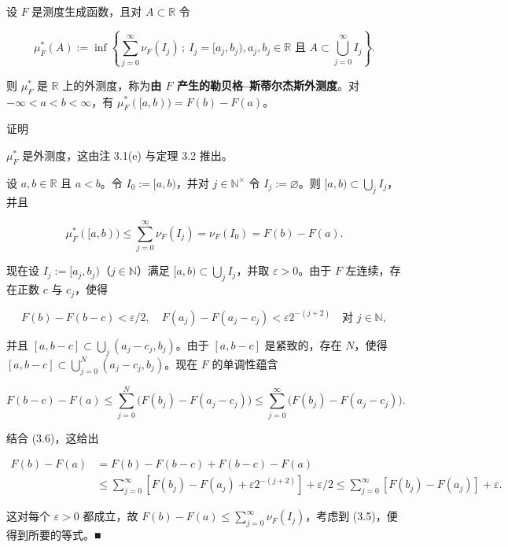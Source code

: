 \begin{proposition}

设 $ F $ 是测度生成函数，且对 $ A \subset \mathbb{R} $ 令

\[
\mu_F^*(A) := \inf\left\{ \sum_{j=0}^{\infty} \nu_F(I_j) \,;\ I_j = [a_j, b_j), a_j, b_j \in \mathbb{R} \text{ 且 } A \subset \bigcup_{j=0}^{\infty} I_j \right\} .
\]

则 $ \mu_F^* $ 是 $ \mathbb{R} $ 上的外测度，称为\textbf{由 $ F $ 产生的勒贝格–斯蒂尔杰斯外测度}。对 $ -\infty < a < b < \infty $，有 $ \mu_F^*([a,b)) = F(b) - F(a) $。

证明

\begin{subitems}
\item

$ \mu_F^* $ 是外测度，这由注 3.1(e) 与定理 3.2 推出。

\item

设 $ a, b \in \mathbb{R} $ 且 $ a < b $。令 $ I_0 := [a, b) $，并对 $ j \in \mathbb{N}^{\times} $ 令 $ I_j := \varnothing $。则 $ [a, b) \subset \bigcup_j I_j $，并且

\begin{equation}
\mu_F^*([a,b)) \le \sum_{j=0}^{\infty} \nu_F(I_j) = \nu_F(I_0) = F(b) - F(a) .\tag{3.5}
\end{equation}
\item

现在设 $ I_j := [a_j, b_j) $（$ j \in \mathbb{N} $）满足 $ [a, b) \subset \bigcup_j I_j $，并取 $ \varepsilon > 0 $。由于 $ F $ 左连续，存在正数 $ c $ 与 $ c_j $，使得

\begin{equation}
F(b) - F(b-c) < \varepsilon/2 , \quad F(a_j) - F(a_j - c_j) < \varepsilon 2^{-(j+2)} \quad \text{对 } j \in \mathbb{N} ,\tag{3.6}
\end{equation}

并且 $ [a, b-c] \subset \bigcup_j (a_j - c_j, b_j) $。由于 $ [a, b-c] $ 是紧致的，存在 $ N $，使得 $ [a, b-c] \subset \bigcup_{j=0}^{N} (a_j - c_j, b_j) $。现在 $ F $ 的单调性蕴含

\[
F(b-c) - F(a) \le \sum_{j=0}^{N} \big( F(b_j) - F(a_j - c_j) \big) \le \sum_{j=0}^{\infty} \big( F(b_j) - F(a_j - c_j) \big) .
\]

结合 (3.6)，这给出

\begin{equation*}
\begin{aligned}
F(b) - F(a) &= F(b) - F(b-c) + F(b-c) - F(a) \\ &\le \sum_{j=0}^{\infty} \left[ F(b_j) - F(a_j) + \varepsilon 2^{-(j+2)} \right] + \varepsilon/2 \le \sum_{j=0}^{\infty} \left[ F(b_j) - F(a_j) \right] + \varepsilon .
\end{aligned}
\end{equation*}

这对每个 $ \varepsilon > 0 $ 都成立，故 $ F(b) - F(a) \le \sum_{j=0}^{\infty} \nu_F(I_j) $，考虑到 (3.5)，便得到所要的等式。\nobreak\hspace{0.35em}■

\end{subitems}

\end{proposition}

